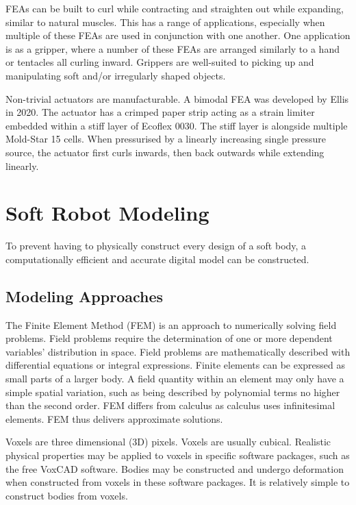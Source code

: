 FEAs can be built to curl while contracting and straighten out while expanding, similar to natural muscles. This has a range of applications, especially when multiple of these FEAs are used in conjunction with one another. One application is as a gripper, where a number of these FEAs are arranged similarly to a hand or tentacles all curling inward. Grippers are well-suited to picking up and manipulating soft and/or irregularly shaped objects. \cite{Whitesides2018}

Non-trivial actuators are manufacturable. A bimodal FEA was developed by Ellis in 2020. The actuator has a crimped paper strip acting as a strain limiter embedded within a stiff layer of Ecoflex 0030. The stiff layer is alongside multiple Mold-Star 15 cells. When pressurised by a linearly increasing single pressure source, the actuator  first curls inwards, then back outwards while extending linearly. \cite{Ellis2020a}

\section{Soft Robot Modeling}

To prevent having to physically construct every design of a soft body, a computationally efficient and accurate digital model can be constructed.

\subsection{Modeling Approaches}

The Finite Element Method (FEM) is an approach to numerically solving field problems. Field problems require the determination of one or more dependent variables' distribution in space. Field problems are mathematically described with differential equations or integral expressions. Finite elements can be expressed as small parts of a larger body. A field quantity within an element may only have a simple spatial variation, such as being described by polynomial terms no higher than the second order. FEM differs from calculus as calculus uses infinitesimal elements. FEM thus delivers approximate solutions. \cite{Cook2002}

Voxels are three dimensional (3D) pixels. Voxels are usually cubical. Realistic physical properties may be applied to voxels in specific software packages, such as the free VoxCAD software. Bodies may be constructed and undergo deformation when constructed from voxels in these software packages. It is relatively simple to construct bodies from voxels. \cite{Cheney2013a,Cheney2015}

